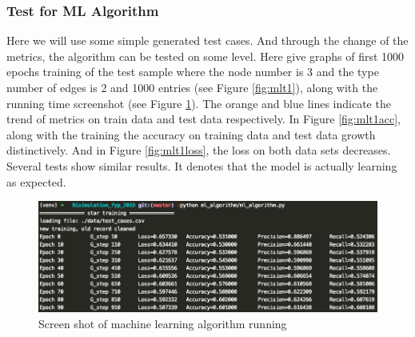 \subsubsection{Test for ML Algorithm}
Here we will use some simple generated test cases.
And through the change of the metrics, the algorithm can be tested on some level.
Here give graphs of first 1000 epochs training of the test sample where the node number is 3 and the type number of edges is 2 and 1000 entries (see Figure \ref{fig:mlt1}), along with the running time screenshot (see Figure \ref{fig:runscreenml}).
The orange and blue lines indicate the trend of metrics on train data and test data respectively.
In Figure \ref{fig:mlt1acc}, along with the training the accuracy on training data and test data growth distinctively.
And in Figure \ref{fig:mlt1loss}, the loss on both data sets decreases.
Several tests show similar results.
It denotes that the model is actually learning as expected.

\begin{figure}[h]
\centering
\includegraphics[width=\textwidth]{img/runscreenml.png}
\caption{Screen shot of machine learning algorithm running}
\label{fig:runscreenml}
\end{figure}

